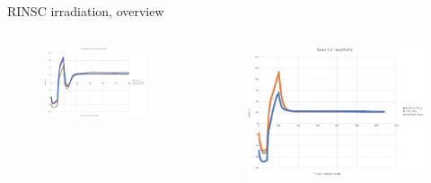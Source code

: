 \documentclass{beamer}
\begin{document}
\begin{frame}{RINSC irradiation, overview}
    \begin{columns}
        \begin{figure}
          \includegraphics[width=0.9\textwidth]{plots/Round5_temp_profile.png}
        \end{figure}
        \begin{figure}
          \includegraphics[width=.9\textwidth]{plots/Round6_temp_profile.png}
        \end{figure}
    \end{columns}
\end{frame}
\end{document}
